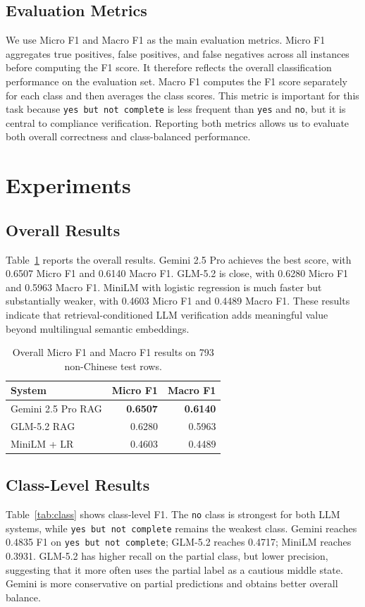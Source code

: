 \documentclass[sigconf,article]{acmart}
\begin{document}
\subsection{Evaluation Metrics}
We use Micro F1 and Macro F1 as the main evaluation metrics. Micro F1 aggregates true positives, false positives, and false negatives across all instances before computing the F1 score. It therefore reflects the overall classification performance on the evaluation set. Macro F1 computes the F1 score separately for each class and then averages the class scores. This metric is important for this task because \texttt{yes but not complete} is less frequent than \texttt{yes} and \texttt{no}, but it is central to compliance verification. Reporting both metrics allows us to evaluate both overall correctness and class-balanced performance.

\section{Experiments}
\subsection{Overall Results}
Table~\ref{tab:overall} reports the overall results. Gemini 2.5 Pro achieves the best score, with 0.6507 Micro F1 and 0.6140 Macro F1. GLM-5.2 is close, with 0.6280 Micro F1 and 0.5963 Macro F1. MiniLM with logistic regression is much faster but substantially weaker, with 0.4603 Micro F1 and 0.4489 Macro F1. These results indicate that retrieval-conditioned LLM verification adds meaningful value beyond multilingual semantic embeddings.

\begin{table}[t]
\caption{Overall Micro F1 and Macro F1 results on 793 non-Chinese test rows.}
\label{tab:overall}
\centering
\begin{tabular}{lrr}
\toprule
System & Micro F1 & Macro F1 \\
\midrule
Gemini 2.5 Pro RAG & \textbf{0.6507} & \textbf{0.6140} \\
GLM-5.2 RAG & 0.6280 & 0.5963 \\
MiniLM + LR & 0.4603 & 0.4489 \\
\bottomrule
\end{tabular}
\end{table}

\subsection{Class-Level Results}
Table~\ref{tab:class} shows class-level F1. The \texttt{no} class is strongest for both LLM systems, while \texttt{yes but not complete} remains the weakest class. Gemini reaches 0.4835 F1 on \texttt{yes but not complete}; GLM-5.2 reaches 0.4717; MiniLM reaches 0.3931. GLM-5.2 has higher recall on the partial class, but lower precision, suggesting that it more often uses the partial label as a cautious middle state. Gemini is more conservative on partial predictions and obtains better overall balance.
\end{document}
